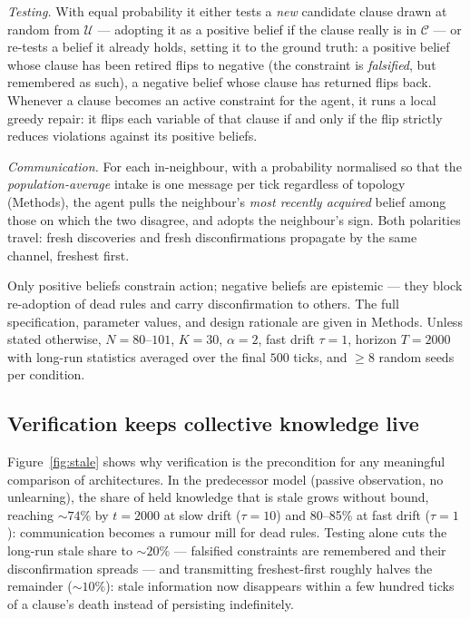 \documentclass{article}
\begin{document}
\emph{Testing.} With equal probability it either tests a \emph{new} candidate clause drawn at random from $\mathcal{U}$ --- adopting it as a positive belief if the clause really is in $\mathcal{C}$ --- or re-tests a belief it already holds, setting it to the ground truth: a positive belief whose clause has been retired flips to negative (the constraint is \emph{falsified}, but remembered as such), a negative belief whose clause has returned flips back. Whenever a clause becomes an active constraint for the agent, it runs a local greedy repair: it flips each variable of that clause if and only if the flip strictly reduces violations against its positive beliefs.

\emph{Communication.} For each in-neighbour, with a probability normalised so that the \emph{population-average} intake is one message per tick regardless of topology (Methods), the agent pulls the neighbour's \emph{most recently acquired} belief among those on which the two disagree, and adopts the neighbour's sign. Both polarities travel: fresh discoveries and fresh disconfirmations propagate by the same channel, freshest first.

Only positive beliefs constrain action; negative beliefs are epistemic --- they block re-adoption of dead rules and carry disconfirmation to others. The full specification, parameter values, and design rationale are given in Methods. Unless stated otherwise, $N=80$--$101$, $K=30$, $\alpha=2$, fast drift $\tau=1$, horizon $T=2000$ with long-run statistics averaged over the final $500$ ticks, and $\geq 8$ random seeds per condition.

\subsection{Verification keeps collective knowledge live}\label{sec:stale}

Figure~\ref{fig:stale} shows why verification is the precondition for any meaningful comparison of architectures. In the predecessor model (passive observation, no unlearning), the share of held knowledge that is stale grows without bound, reaching ${\sim}74\%$ by $t=2000$ at slow drift ($\tau=10$) and 80--85\% at fast drift ($\tau=1$): communication becomes a rumour mill for dead rules. Testing alone cuts the long-run stale share to ${\sim}20\%$ --- falsified constraints are remembered and their disconfirmation spreads --- and transmitting freshest-first roughly halves the remainder (${\sim}10\%$): stale information now disappears within a few hundred ticks of a clause's death instead of persisting indefinitely.
\end{document}
